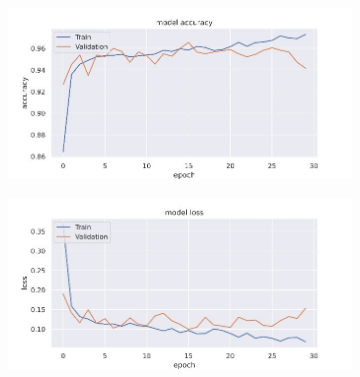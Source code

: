 \begin{figure}
    \centering
    \begin{subfigure}[b]{0.2\textwidth}
        \includegraphics[width=\textwidth]{figures/lr/1.jpg}
    \end{subfigure}
    \begin{subfigure}[b]{0.2\textwidth}
        \includegraphics[width=\textwidth]{figures/lr/2.jpg}
    \end{subfigure}




\end{figure}
